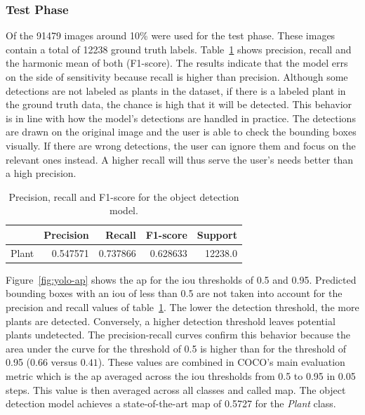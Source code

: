 \documentclass[draft,final]{vutinfth} %
\begin{document}
\subsubsection{Test Phase}
\label{sssec:yolo-test}

Of the 91479 images around 10\% were used for the test phase. These
images contain a total of 12238 ground truth
labels. Table~\ref{tab:yolo-metrics} shows precision, recall and the
harmonic mean of both (F1-score). The results indicate that the model
errs on the side of sensitivity because recall is higher than
precision. Although some detections are not labeled as plants in the
dataset, if there is a labeled plant in the ground truth data, the
chance is high that it will be detected. This behavior is in line with
how the model's detections are handled in practice. The detections are
drawn on the original image and the user is able to check the bounding
boxes visually. If there are wrong detections, the user can ignore
them and focus on the relevant ones instead. A higher recall will thus
serve the user's needs better than a high precision.

\begin{table}[h]
  \centering
  \begin{tabular}{lrrrr}
    \toprule
    {} &  Precision &    Recall &  F1-score &  Support \\
    \midrule
    Plant        &   0.547571 &  0.737866 &  0.628633 &  12238.0 \\
    \bottomrule
  \end{tabular}
  \caption{Precision, recall and F1-score for the object detection model.}
  \label{tab:yolo-metrics}
\end{table}

Figure~\ref{fig:yolo-ap} shows the \gls{ap} for the \gls{iou}
thresholds of 0.5 and 0.95. Predicted bounding boxes with an \gls{iou}
of less than 0.5 are not taken into account for the precision and
recall values of table~\ref{tab:yolo-metrics}. The lower the detection
threshold, the more plants are detected. Conversely, a higher
detection threshold leaves potential plants undetected. The
precision-recall curves confirm this behavior because the area under
the curve for the threshold of 0.5 is higher than for the threshold of
0.95 ($0.66$ versus $0.41$). These values are combined in COCO's
\cite{lin2015} main evaluation metric which is the \gls{ap} averaged
across the \gls{iou} thresholds from 0.5 to 0.95 in 0.05 steps. This
value is then averaged across all classes and called \gls{map}. The
object detection model achieves a state-of-the-art \gls{map} of 0.5727
for the \emph{Plant} class.
\end{document}
